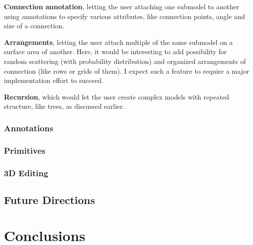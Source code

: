 \documentclass[english]{article}
\begin{document}
\textbf{Connection annotation}, letting the user attaching one submodel to another using annotations to specify various attributes, like connection points, angle and size of a connection.

\textbf{Arrangements}, letting the user attach multiple of the same submodel on a surface area of another. Here, it would be interesting to add possibility for random scattering (with probability distribution) and organized arrangements of connection (like rows or grids of them). I expect such a feature to require a major implementation effort to succeed.

\textbf{Recursion}, which would let the user create complex models with repeated structure, like trees, as discussed earlier.

\subsubsection{Annotations}

\subsubsection{Primitives}

\subsubsection{3D Editing}






\subsection{Future Directions}






\section{Conclusions} \label{section_conclusion}




\end{document}
